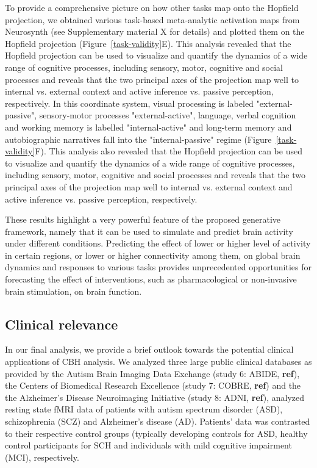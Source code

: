 \documentclass{article}
\begin{document}
To provide a comprehensive picture on how other tasks map onto the Hopfield projection, we obtained various task-based meta-analytic activation maps from Neurosynth (see Supplementary material X for details)  and plotted them on the Hopfield projection (Figure~\ref{task-validity}E). This analysis revealed that the Hopfield projection can be used to visualize and quantify the dynamics of a wide range of cognitive processes, including sensory, motor, cognitive and social processes and reveals that the two principal axes of the projection map well to internal vs. external context and active inference vs. passive perception, respectively.
In this coordinate system, visual processing is labeled "external-passive", sensory-motor processes "external-active", language, verbal cognition and working memory is labelled "internal-active" and long-term memory and autobiographic narratives fall into the "internal-passive" regime (Figure~\ref{task-validity}F). This analysis also revealed that the Hopfield projection can be used to visualize and quantify the dynamics of a wide range of cognitive processes, including sensory, motor, cognitive and social processes and reveals that the two principal axes of the projection map well to internal vs. external context and active inference vs. passive perception, respectively.

These results highlight a very powerful feature of the proposed generative framework, namely that it can be used to simulate and predict brain activity under different conditions. Predicting the effect of lower or higher level of activity in certain regions, or lower or higher connectivity among them, on global brain dynamics and responses to various tasks provides unprecedented opportunities for forecasting the effect of interventions, such as pharmacological or non-invasive brain stimulation, on brain function.

\subsection{Clinical relevance}\label{Clinical relevance}

In our final analysis, we provide a brief outlook towards the potential clinical applications of CBH analysis. We analyzed three large public clinical databases as provided by the Autism Brain Imaging Data Exchange (study 6: ABIDE, \textbf{ref}), the Centers of Biomedical Research Excellence (study 7: COBRE, \textbf{ref}) and the the Alzheimer's Disease Neuroimaging Initiative (study 8: ADNI, \textbf{ref}), analyzed resting state fMRI data of patients with autism spectrum disorder (ASD), schizophrenia (SCZ) and Alzheimer's disease (AD). Patients' data was contrasted to their respective control groups (typically developing controls for ASD, healthy control participants for SCH and individuals with mild cognitive impairment (MCI), respectively.
\end{document}
